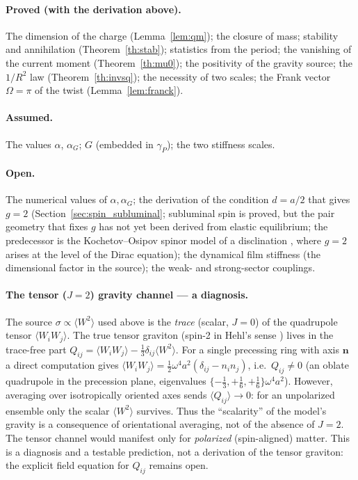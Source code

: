 \documentclass[12pt,a4paper]{article}
\begin{document}
\paragraph{Proved (with the derivation above).} The dimension of the charge
(Lemma~\ref{lem:qm}); the closure of mass; stability and annihilation
(Theorem~\ref{th:stab}); statistics from the period; the vanishing of the
current moment (Theorem~\ref{th:mu0}); the positivity of the gravity source;
the $1/R^2$ law (Theorem~\ref{th:invsq}); the necessity of two scales; the
Frank vector $\Omega=\pi$ of the twist (Lemma~\ref{lem:franck}).

\paragraph{Assumed.} The values $\alpha$, $\alpha_G$; $G$ (embedded in
$\gamma_P$); the two stiffness scales.

\paragraph{Open.} The numerical values of $\alpha,\alpha_G$; the derivation of the condition $d=a/2$ that gives $g=2$
(Section~\ref{sec:spin_subluminal}; subluminal spin is proved, but the pair geometry
that fixes $g$ has not yet been derived from elastic equilibrium; the predecessor is
the Kochetov--Osipov spinor model of a disclination \cite{osipov2010}, where $g=2$
arises at the level of the Dirac equation); the
dynamical film stiffness (the dimensional factor in the source); the weak- and
strong-sector couplings.

\paragraph{The tensor ($J{=}2$) gravity channel --- a diagnosis.} The source
$\sigma\propto\langle W^2\rangle$ used above is the \emph{trace} (scalar, $J=0$)
of the quadrupole tensor $\langle W_iW_j\rangle$. The true tensor graviton
(spin-2 in Hehl's sense \cite{hehl1995}) lives in the trace-free part
$Q_{ij}=\langle W_iW_j\rangle-\tfrac13\delta_{ij}\langle W^2\rangle$. For a
single precessing ring with axis $\mathbf n$ a direct computation gives
$\langle W_iW_j\rangle=\tfrac12\omega^4a^2(\delta_{ij}-n_in_j)$, i.e.\
$Q_{ij}\neq0$ (an oblate quadrupole in the precession plane, eigenvalues
$\{-\tfrac13,+\tfrac16,+\tfrac16\}\omega^4a^2$). However, averaging over
isotropically oriented axes sends $\langle Q_{ij}\rangle\to0$: for an
unpolarized ensemble only the scalar $\langle W^2\rangle$ survives. Thus the
``scalarity'' of the model's gravity is a consequence of orientational
averaging, not of the absence of $J=2$. The tensor channel would manifest only
for \emph{polarized} (spin-aligned) matter. This is a diagnosis and a testable
prediction, not a derivation of the tensor graviton: the explicit field
equation for $Q_{ij}$ remains open.
\end{document}
